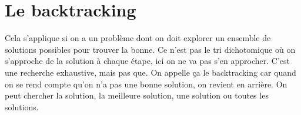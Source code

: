 \documentclass[10pt]{article}
\begin{document}
\section{Le backtracking}
Cela s'applique si on a un problème dont on doit explorer un ensemble de solutions possibles pour trouver la bonne. Ce n'est pas le tri dichotomique où on s'approche de la solution à chaque étape, ici on ne va pas s'en approcher. C'est une recherche exhaustive, mais pas que. 
\newline \newline 
On appelle ça le backtracking car quand on se rend compte qu'on n'a pas une bonne solution, on revient en arrière.  
\newline \newline 
On peut chercher la solution, la meilleure solution, une solution ou toutes les solutions.
\end{document}
